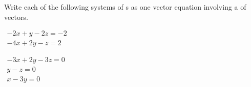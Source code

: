 \begin{exercise} \label{ex:syslc} 
Write each of the following systems of s as one vector equation involving a  of vectors.
\begin{Parts}
\item\label{ex:syslci} \(\begin{array}{l}
-2x+y-2z=-2\\
-4x+2y-z=2
\end{array}\)

\item\label{ex:syslcii} \(\begin{array}{l}
-3x+2y-3z=0\\
y-z=0\\
x-3y=0
\end{array}\)



\end{Parts}
\end{exercise}
